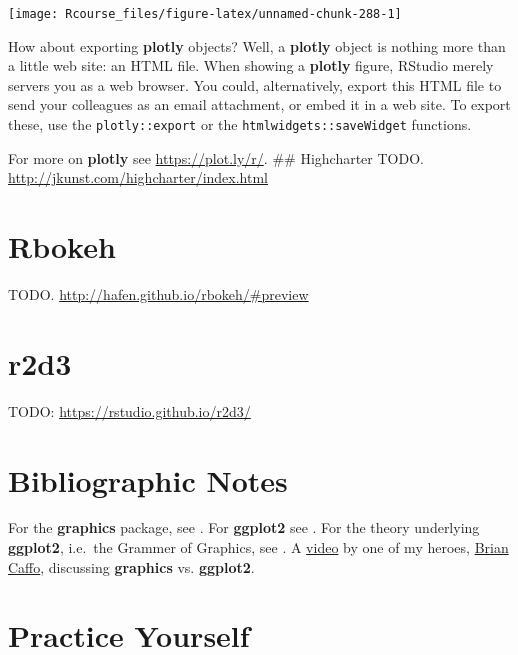 \documentclass[]{book}
\theoremstyle{definition}
\theoremstyle{definition}
\theoremstyle{definition}
\theoremstyle{remark}
\begin{document}
\texttt{[image: Rcourse\_files/figure-latex/unnamed-chunk-288-1]}

How about exporting \textbf{plotly} objects? Well, a \textbf{plotly}
object is nothing more than a little web site: an HTML file. When
showing a \textbf{plotly} figure, RStudio merely servers you as a web
browser. You could, alternatively, export this HTML file to send your
colleagues as an email attachment, or embed it in a web site. To export
these, use the \texttt{plotly::export} or the
\texttt{htmlwidgets::saveWidget} functions.

For more on \textbf{plotly} see \url{https://plot.ly/r/}. \#\#
Highcharter TODO. \url{http://jkunst.com/highcharter/index.html}

\section{Rbokeh}\label{rbokeh}

TODO. \url{http://hafen.github.io/rbokeh/\#preview}

\section{r2d3}\label{r2d3}

TODO: \url{https://rstudio.github.io/r2d3/}

\section{Bibliographic Notes}\label{bibliographic-notes-9}

For the \textbf{graphics} package, see \citet{Rlanguage}. For
\textbf{ggplot2} see \citet{ggplot2}. For the theory underlying
\textbf{ggplot2}, i.e.~the Grammer of Graphics, see
\citet{wilkinson2006grammar}. A
\href{https://www.youtube.com/watch?v=9Objw9Tvhb4\&feature=youtu.be}{video}
by one of my heroes, \href{http://www.bcaffo.com/}{Brian Caffo},
discussing \textbf{graphics} vs. \textbf{ggplot2}.

\section{Practice Yourself}\label{practice-yourself-8}
\end{document}

